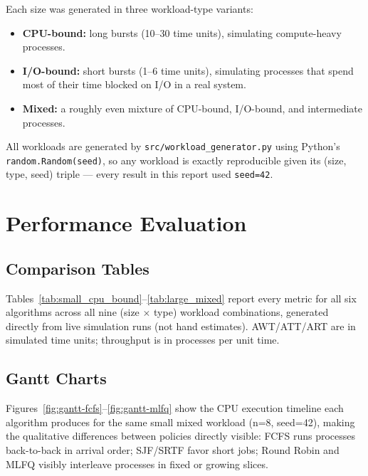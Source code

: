 \documentclass[11pt]{article}
\begin{document}
Each size was generated in three workload-type variants:

\begin{itemize}
  \item \textbf{CPU-bound:} long bursts (10--30 time units), simulating
    compute-heavy processes.
  \item \textbf{I/O-bound:} short bursts (1--6 time units), simulating
    processes that spend most of their time blocked on I/O in a real
    system.
  \item \textbf{Mixed:} a roughly even mixture of CPU-bound, I/O-bound, and
    intermediate processes.
\end{itemize}

All workloads are generated by \texttt{src/workload\_generator.py} using
Python's \texttt{random.Random(seed)}, so any workload is exactly
reproducible given its (size, type, seed) triple --- every result in this
report used \texttt{seed=42}.

\section{Performance Evaluation}
\label{sec:evaluation}

\subsection{Comparison Tables}

Tables~\ref{tab:small_cpu_bound}--\ref{tab:large_mixed} report every metric
for all six algorithms across all nine (size $\times$ type) workload
combinations, generated directly from live simulation runs (not hand
estimates). AWT/ATT/ART are in simulated time units; throughput is in
processes per unit time.



\subsection{Gantt Charts}

Figures~\ref{fig:gantt-fcfs}--\ref{fig:gantt-mlfq} show the CPU execution
timeline each algorithm produces for the same small mixed workload
(n=8, seed=42), making the qualitative differences between policies
directly visible: FCFS runs processes back-to-back in arrival order;
SJF/SRTF favor short jobs; Round Robin and MLFQ visibly interleave
processes in fixed or growing slices.
\end{document}
